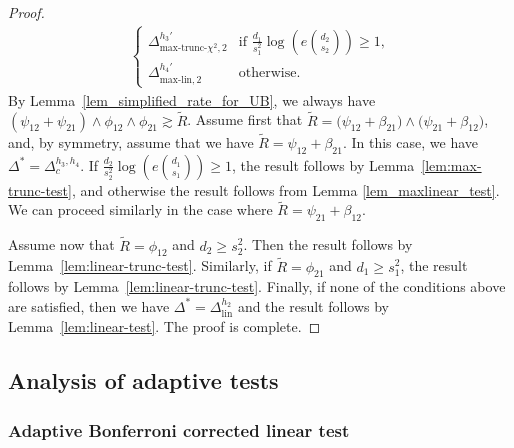 \documentclass{article}
\newcommand{\lin}{\text{lin}}
\newcommand{\chisqmax}{\text{max-trunc-$\chi^2$}}
\newcommand{\linmax}{\text{max-lin}}
\theoremstyle{remark}
\begin{document}
\begin{proof}
\begin{align*}
\begin{cases}
        \Delta^{h_3'}_{\chisqmax, 2} & \text{if  $\frac{d_1}{s_1^2}\log\!\left(e{d_2 \choose s_2}\right) \geq 1$,} \\ \Delta^{h_4'}_{\linmax, 2} & \text{otherwise}.
    \end{cases} 
\end{align*}
By Lemma~\ref{lem_simplified_rate_for_UB}, we always have $(\psi_{12} + \psi_{21}) \land \phi_{12} \land \phi_{21} \gtrsim \tilde R$. 
Assume first that  $\tilde R = \big(\psi_{12} + \beta_{21}\big) \land \big(\psi_{21} + \beta_{12}\big)$, and, by symmetry, assume that we have  $\tilde R = \psi_{12} + \beta_{21}$. 
In this case, we have $\Delta^* = \Delta^{h_3, h_4}_{c}$. If $\frac{d_2}{s_2^2}\log\!\left(e{d_1 \choose s_1}\right) \geq 1$, the result follows by Lemma~\ref{lem:max-trunc-test}, and otherwise the result follows from Lemma \ref{lem_maxlinear_test}. We can proceed similarly in the case where $\tilde R = \psi_{21} + \beta_{12}$. 

Assume now that $\tilde R = \phi_{12}$ and $d_2 \geq s_2^2$. Then the result follows by Lemma~\ref{lem:linear-trunc-test}. Similarly, if  
$\tilde R = \phi_{21}$ and $d_1 \geq s_1^2$, the result follows by Lemma~\ref{lem:linear-trunc-test}.
Finally, if none of the conditions above are satisfied, then we have $\Delta^* = \Delta^{h_2}_{\lin}$ and the result follows by Lemma~\ref{lem:linear-test}. 
The proof is complete.
\end{proof}

\subsection{Analysis of adaptive tests}

\subsubsection{Adaptive Bonferroni corrected linear test}
\end{document}
